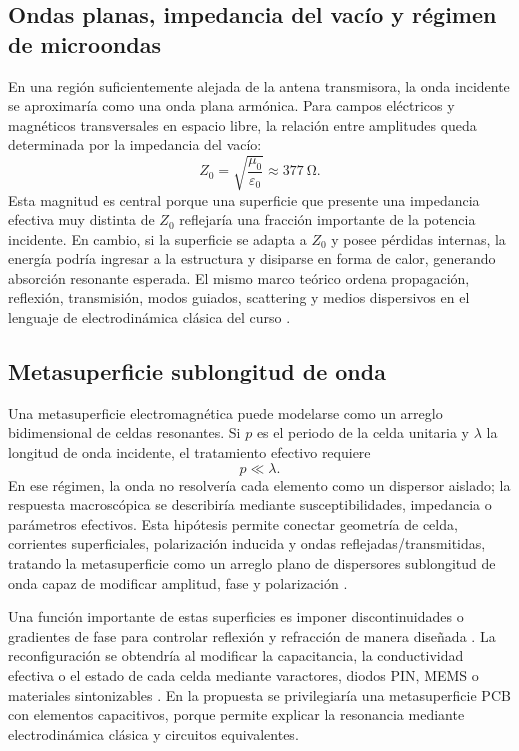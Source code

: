 \documentclass[12pt,a4paper]{article}
\begin{document}
\subsection{Ondas planas, impedancia del vacío y régimen de microondas}

En una región suficientemente alejada de la antena transmisora, la onda incidente se aproximaría como una onda plana armónica. Para campos eléctricos y magnéticos transversales en espacio libre, la relación entre amplitudes queda determinada por la impedancia del vacío:
\begin{equation}
  Z_0=\sqrt{\frac{\mu_0}{\varepsilon_0}}\approx \SI{377}{\ohm}.
  \label{eq:z0}
\end{equation}
Esta magnitud es central porque una superficie que presente una impedancia efectiva muy distinta de \(Z_0\) reflejaría una fracción importante de la potencia incidente. En cambio, si la superficie se adapta a \(Z_0\) y posee pérdidas internas, la energía podría ingresar a la estructura y disiparse en forma de calor, generando absorción resonante esperada. El mismo marco teórico ordena propagación, reflexión, transmisión, modos guiados, scattering y medios dispersivos en el lenguaje de electrodinámica clásica del curso \citep{milton2024classical,jackson1999classical,griffiths2017introduction}.

\subsection{Metasuperficie sublongitud de onda}

Una metasuperficie electromagnética puede modelarse como un arreglo bidimensional de celdas resonantes. Si \(p\) es el periodo de la celda unitaria y \(\lambda\) la longitud de onda incidente, el tratamiento efectivo requiere
\begin{equation}
  p \ll \lambda.
  \label{eq:subwavelength}
\end{equation}
En ese régimen, la onda no resolvería cada elemento como un dispersor aislado; la respuesta macroscópica se describiría mediante susceptibilidades, impedancia o parámetros efectivos. Esta hipótesis permite conectar geometría de celda, corrientes superficiales, polarización inducida y ondas reflejadas/transmitidas, tratando la metasuperficie como un arreglo plano de dispersores sublongitud de onda capaz de modificar amplitud, fase y polarización \citep{holloway2012overview,yu2014flat}.

Una función importante de estas superficies es imponer discontinuidades o gradientes de fase para controlar reflexión y refracción de manera diseñada \citep{yu2011phase,kildishev2013planar}. La reconfiguración se obtendría al modificar la capacitancia, la conductividad efectiva o el estado de cada celda mediante varactores, diodos PIN, MEMS o materiales sintonizables \citep{cui2014coding,zheludev2012metamaterials}. En la propuesta se privilegiaría una metasuperficie PCB con elementos capacitivos, porque permite explicar la resonancia mediante electrodinámica clásica y circuitos equivalentes.
\end{document}

